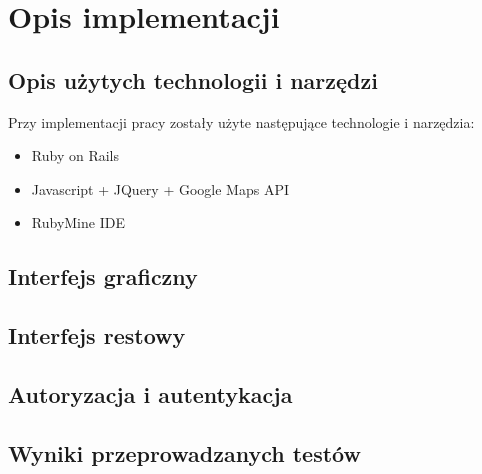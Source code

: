 \chapter{Opis implementacji}
\label{cha:uzywaneTechnologie}

\section{Opis użytych technologii i narzędzi}
\label{sec:technology}
Przy implementacji pracy zostały użyte następujące technologie i narzędzia:
\begin{itemize}
\item Ruby on Rails
\item Javascript + JQuery + Google Maps API
\item RubyMine IDE
\end{itemize}

\section{Interfejs graficzny}
\label{sec:interfejsGraficzny}

\section{Interfejs restowy}
\label{sec:interfejsRestowy}

\section{Autoryzacja i autentykacja}
\label{sec:autoryzacjaAutentykacja}

\section{Wyniki przeprowadzanych testów}
\label{sec;testResult}
